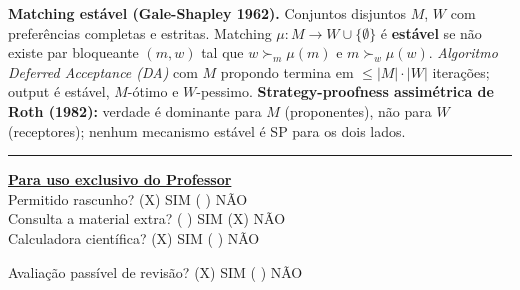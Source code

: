 \documentclass[11pt,addpoints]{exam}
\begin{document}
    \textbf{Matching estável (Gale-Shapley 1962).} Conjuntos disjuntos $M$, $W$ com preferências completas e estritas. Matching $\mu: M \to W \cup \{\emptyset\}$ é \textbf{estável} se não existe par bloqueante $(m, w)$ tal que $w \succ_m \mu(m)$ e $m \succ_w \mu(w)$. \emph{Algoritmo Deferred Acceptance (DA)} com $M$ propondo termina em $\leq |M| \cdot |W|$ iterações; output é estável, $M$-ótimo e $W$-pessimo. \textbf{Strategy-proofness assimétrica de Roth (1982):} verdade é dominante para $M$ (proponentes), não para $W$ (receptores); nenhum mecanismo estável é SP para os dois lados.

    \vspace{0.5em}
    \hrule
    \vspace{1em}
    \noindent\textbf{\underline{Para uso exclusivo do Professor}} \\[0.2em]

    Permitido rascunho? \hfill (X) SIM \quad (   ) NÃO\\[0.3em]
    Consulta a material extra? \hfill (   ) SIM \quad (X) NÃO\\[0.3em]
    Calculadora científica? \hfill (X) SIM \quad (   ) NÃO

    \vspace{0.6em}
    \noindent Avaliação passível de revisão? \hfill (X) SIM \quad (   ) NÃO

    \newpage
\fi
\end{document}
